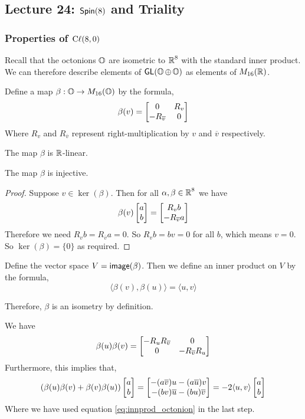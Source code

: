 \subsection{Lecture 24: $\operatorname{\textsf{Spin}}(8)$ and Triality}
\subsubsection{Properties of $\operatorname{C\ell}(8,0)$}
Recall that the octonions $\operatorname{\mathbb{O}}$ are isometric to $\operatorname{\mathbb{R}}^8$ with the standard inner product. We can therefore describe elements of $\operatorname{\textsf{GL}}(\operatorname{\mathbb{O}}\oplus \operatorname{\mathbb{O}})$ as elements of $M_{16}(\operatorname{\mathbb{R}})$.

\begin{defn}
    Define a map $\beta : \operatorname{\mathbb{O}} \to M_{16}(\operatorname{\mathbb{O}})$ by the formula,
    \[\beta(v) = \begin{bmatrix}0 & R_v\\-R_{\overline{v}}&0\end{bmatrix}\]
    Where $R_v$ and $R_{\overline{v}}$ represent right-multiplication by $v$ and $\overline{v}$ respectively.
\end{defn}
\begin{remark*}
    The map $\beta$ is $\operatorname{\mathbb{R}}$-linear.
\end{remark*}
\begin{lemma}
    The map $\beta$ is injective.
\end{lemma}
\begin{proof}
    Suppose $v\in\ker(\beta)$. Then for all $\alpha,\beta\in \operatorname{\mathbb{R}}^8$ we have
    \[\beta(v)\begin{bmatrix}a\\b\end{bmatrix} =\begin{bmatrix}R_vb\\ -R_{\overline{v}}a\end{bmatrix}\]
    Therefore we need $R_vb=R_{\overline{v}}a=0$. So $R_v b = bv = 0$ for all $b$, which means $v=0$. So $\ker(\beta)=\{0\}$ as required.
\end{proof}
\begin{defn}
    Define the vector space $V = \operatorname{\textsf{image}}(\beta)$. Then we define an inner product on $V$ by the formula,
    \[\langle \beta(v),\beta(u)\rangle = \langle u,v\rangle\]
\end{defn}
\begin{remark*}
    Therefore, $\beta$ is an isometry by definition.
\end{remark*}
\begin{remark*}
    We have
    \[\beta(u)\beta(v)=\begin{bmatrix}-R_uR_{\overline{v}}&0\\0&-R_{\overline{v}}R_u\end{bmatrix}\]
    Furthermore, this implies that,
    \[(\beta(u)\beta(v) + \beta(v)\beta(u))\begin{bmatrix}a\\b\end{bmatrix} =\begin{bmatrix}-(a\overline{v})u-(a\overline{u})v\\-(bv)\overline{u}-(bu)\overline{v}\end{bmatrix} = -2\langle u,v\rangle \begin{bmatrix}a\\b\end{bmatrix} \]
    Where we have used equation \eqref{eq:innprod_octonion} in the last step.
\end{remark*}
